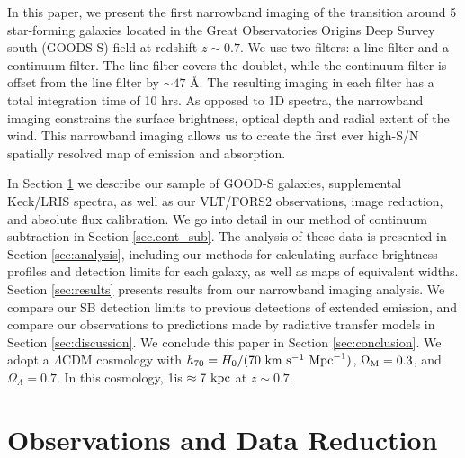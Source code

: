\documentclass[twocolumn]{aastex61}
\begin{document}
In this paper, we present the first narrowband imaging of the  transition around 5 star-forming  galaxies located in the Great Observatories Origins Deep Survey south (GOODS-S) field at redshift $z \sim 0.7$. 
We use two filters: a line filter and a continuum filter. The line filter covers the  doublet, while the continuum filter is offset from the line filter by ${\sim}47$ \AA.    
The resulting imaging in each filter has a total integration time of 10 hrs.
As opposed to 1D spectra, the narrowband imaging constrains the surface brightness, optical depth and radial extent of the wind. This narrowband imaging allows us to create the first ever high-S/N spatially resolved map of  emission and absorption. 

In Section \ref{sec:obs_red} we describe our sample of GOOD-S galaxies, supplemental Keck/LRIS spectra, as well as our VLT/FORS2 observations, image reduction, and absolute flux calibration. We go into detail in our method of continuum subtraction in Section \ref{sec.cont_sub}. The analysis of these data is presented in Section \ref{sec:analysis}, 
including our methods for calculating surface brightness profiles and detection limits for each galaxy, as well as maps of  equivalent widths.
Section \ref{sec:results} presents results from our narrowband imaging analysis. We compare our SB detection limits to previous detections of extended  emission,  and compare our observations to predictions made by radiative transfer models in Section \ref{sec:discussion}. We conclude this paper in Section \ref{sec:conclusion}.
We adopt a $\Lambda$CDM cosmology with $h_{70} = H_0/(70\ \rm{ km}\ \rm{ s}^{-1}\ \rm{ Mpc}^{-1})$, $\Omega_{\rm{M}}= 0.3$, and $\Omega_{\Lambda} = 0.7$. In this cosmology, 1\arcsec is $\approx 7\ \rm kpc$ at $z \sim 0.7$.


\section{Observations and Data Reduction}\label{sec:obs_red}
\end{document}
